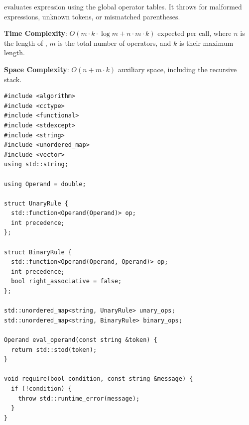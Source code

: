 \begin{compactitem}
  \item {} evaluates expression  using the global operator tables. It throws  for malformed expressions, unknown tokens, or mismatched parentheses.
\end{compactitem}

\textbf{Time Complexity}: $O(m \cdot k \cdot \log m + n \cdot m \cdot k)$ expected per call, where $n$ is the length of , $m$ is the total number of operators, and $k$ is their maximum length.

\textbf{Space Complexity}: $O(n + m \cdot k)$ auxiliary space, including the recursive stack.

\begin{lstlisting}[style=cpp]
#include <algorithm>
#include <cctype>
#include <functional>
#include <stdexcept>
#include <string>
#include <unordered_map>
#include <vector>
using std::string;

using Operand = double;

struct UnaryRule {
  std::function<Operand(Operand)> op;
  int precedence;
};

struct BinaryRule {
  std::function<Operand(Operand, Operand)> op;
  int precedence;
  bool right_associative = false;
};

std::unordered_map<string, UnaryRule> unary_ops;
std::unordered_map<string, BinaryRule> binary_ops;

Operand eval_operand(const string &token) {
  return std::stod(token);
}

void require(bool condition, const string &message) {
  if (!condition) {
    throw std::runtime_error(message);
  }
}


\end{lstlisting}
